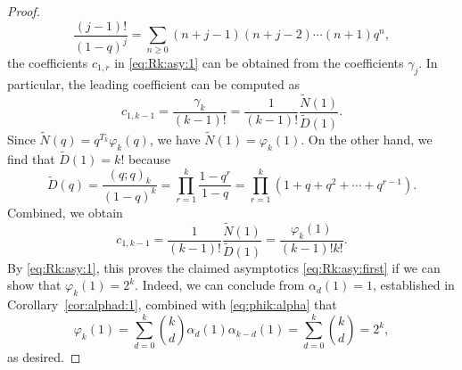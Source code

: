 \documentclass[10pt,a4paper]{amsart}
\begin{document}
\begin{proof}
\begin{equation*}
    \frac{(j - 1) !}{(1 - q)^j} = \sum_{n \geq 0} (n + j - 1) (n + j -
     2) \cdots (n + 1) q^n,
  \end{equation*}
  the coefficients $c_{1, r}$ in \eqref{eq:Rk:asy:1} can be obtained from the
  coefficients $\gamma_j$. In particular, the leading coefficient can be
  computed as
  \begin{equation*}
    c_{1, k - 1} = \frac{\gamma_k}{(k - 1) !} = \frac{1}{(k - 1) !} 
     \frac{\tilde{N} (1)}{\tilde{D} (1)} .
  \end{equation*}
  Since $\tilde{N} (q) = q^{T_k} \varphi_k (q)$, we have $\tilde{N} (1) =
  \varphi_k (1)$. On the other hand, we find that $\tilde{D} (1) = k!$ because
  \begin{equation*}
    \tilde{D} (q) = \frac{(q ; q)_k}{(1 - q)^k} = \prod_{r = 1}^k \frac{1 -
     q^r}{1 - q} = \prod_{r = 1}^k (1 + q + q^2 + \cdots + q^{r - 1}) .
  \end{equation*}
  Combined, we obtain
  \begin{equation*}
    c_{1, k - 1} = \frac{1}{(k - 1) !}  \frac{\tilde{N} (1)}{\tilde{D} (1)} =
     \frac{\varphi_k (1)}{(k - 1) !k!} .
  \end{equation*}
  By \eqref{eq:Rk:asy:1}, this proves the claimed asymptotics
  \eqref{eq:Rk:asy:first} if we can show that $\varphi_k (1) = 2^k$. Indeed,
  we can conclude from $\alpha_d (1) = 1$, established in
  Corollary~\ref{cor:alphad:1}, combined with \eqref{eq:phik:alpha} that
  \begin{equation*}
    \varphi_k (1) = \sum_{d = 0}^k \binom{k}{d} \alpha_d (1) \alpha_{k - d}
     (1) = \sum_{d = 0}^k \binom{k}{d} = 2^k,
  \end{equation*}
  as desired.
\end{proof}
\end{document}
